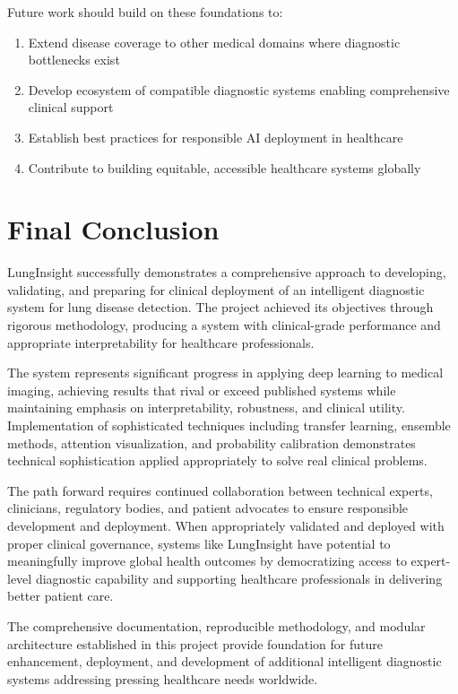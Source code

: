 {Future work should build on these foundations to:

\begin{enumerate}
    \item Extend disease coverage to other medical domains where diagnostic bottlenecks exist
    \item Develop ecosystem of compatible diagnostic systems enabling comprehensive clinical support
    \item Establish best practices for responsible AI deployment in healthcare
    \item Contribute to building equitable, accessible healthcare systems globally
\end{enumerate}

\section{Final Conclusion}

LungInsight successfully demonstrates a comprehensive approach to developing, validating, and preparing for clinical deployment of an intelligent diagnostic system for lung disease detection. The project achieved its objectives through rigorous methodology, producing a system with clinical-grade performance and appropriate interpretability for healthcare professionals.

The system represents significant progress in applying deep learning to medical imaging, achieving results that rival or exceed published systems while maintaining emphasis on interpretability, robustness, and clinical utility. Implementation of sophisticated techniques including transfer learning, ensemble methods, attention visualization, and probability calibration demonstrates technical sophistication applied appropriately to solve real clinical problems.

The path forward requires continued collaboration between technical experts, clinicians, regulatory bodies, and patient advocates to ensure responsible development and deployment. When appropriately validated and deployed with proper clinical governance, systems like LungInsight have potential to meaningfully improve global health outcomes by democratizing access to expert-level diagnostic capability and supporting healthcare professionals in delivering better patient care.

The comprehensive documentation, reproducible methodology, and modular architecture established in this project provide foundation for future enhancement, deployment, and development of additional intelligent diagnostic systems addressing pressing healthcare needs worldwide.

}
